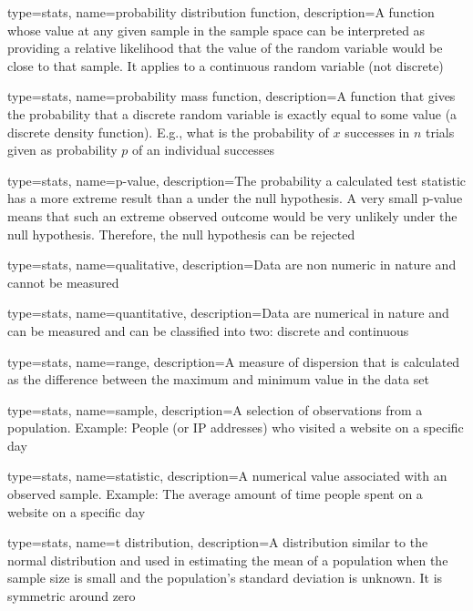 {
	type=stats,
    name=probability distribution function,
    description={A function whose value at any given sample in the sample space can be interpreted as providing a relative likelihood that the value of the random variable would be close to that sample.  It applies to a continuous random variable (not discrete)}
}

{
	type=stats,
    name=probability mass function,
    description={A function that gives the probability that a discrete random variable is exactly equal to some value (a discrete density function).  E.g., what is the probability of $x$ successes in $n$ trials given as probability $p$ of an individual successes}
}

{
	type=stats,
    name=p-value,
    description={The probability a calculated test statistic has a more extreme result than a under the null hypothesis.   A very small p-value means that such an extreme observed outcome would be very unlikely under the null hypothesis.  Therefore, the null hypothesis can be rejected}
}

{
	type=stats,
    name=qualitative,
    description={Data are non numeric in nature and cannot be measured}
}

{
	type=stats,
    name=quantitative,
    description={Data are numerical in nature and can be measured and can be classified into two: discrete and continuous}
}

{
	type=stats,
    name=range,
    description={A measure of dispersion that is calculated as the difference between the maximum and minimum value in the data set}
}

{
	type=stats,
    name=sample,
    description={A selection of observations from a population. Example: People (or IP addresses) who visited a website on a specific day}
}

{
	type=stats,
    name=statistic,
    description={A numerical value associated with an observed sample. Example: The average amount of time people spent on a website on a specific day}
}

{
	type=stats,
    name=t distribution,
    description={A distribution similar to the normal distribution and used in estimating the mean of a population when the sample size is small and the population's standard deviation is unknown.  It is symmetric around zero}
}

